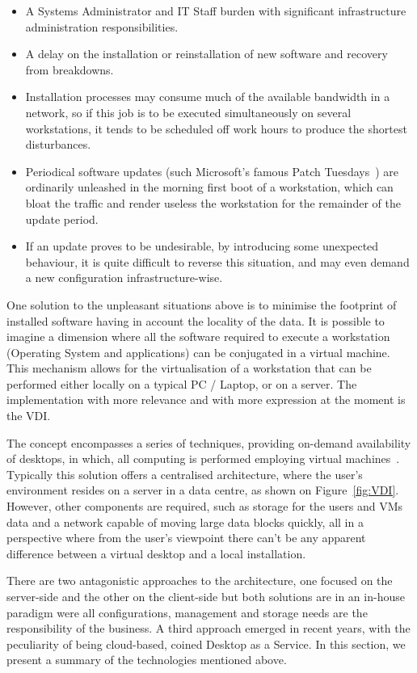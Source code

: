 \begin{itemize}
	\item A Systems Administrator and IT Staff burden with significant infrastructure administration responsibilities.
	\item A delay on the installation or reinstallation of new software and recovery from breakdowns.
	\item Installation processes may consume much of the available bandwidth in a network, so if this job is to be executed simultaneously on several workstations, it tends to be scheduled off work hours to produce the shortest disturbances.
	\item Periodical software updates (such Microsoft's famous Patch Tuesdays~\cite{patch_2017}) are ordinarily unleashed in the morning first boot of a workstation, which can bloat the traffic and render useless the workstation for the remainder of the update period.
	\item If an update proves to be undesirable, by introducing some unexpected behaviour, it is quite difficult to reverse this situation, and may even demand a new configuration infrastructure-wise.
\end{itemize}

One solution to the unpleasant situations above is to minimise the footprint of installed software having in account the locality of the data. 
It is possible to imagine a dimension where all the software required to execute a workstation (Operating System and applications) can be conjugated in a virtual machine. This mechanism allows for the virtualisation of a workstation that can be performed either locally on a typical PC / Laptop, or on a server. The implementation with more relevance and with more expression at the moment is the \gls{VDI}.

The concept encompasses a series of techniques, providing on-demand availability of desktops, in which, all computing is performed employing virtual machines~\cite{VMWare_VDI2006}.
Typically this solution offers a centralised architecture, where the user's environment resides on a server in a data centre, as shown on Figure~\ref{fig:VDI}. However, other components are required, such as storage for the users and VMs data and a network capable of moving large data blocks quickly, all in a perspective where from the user's viewpoint there can't be any apparent difference between a virtual desktop and a local installation.

There are two antagonistic approaches to the architecture, one focused on the server-side and the other on the client-side but both solutions are in an in-house paradigm were all configurations, management and storage needs are the responsibility of the business. A third approach emerged in recent years, with the peculiarity of being cloud-based, coined Desktop as a Service.
In this section, we present a summary of the technologies mentioned above.

